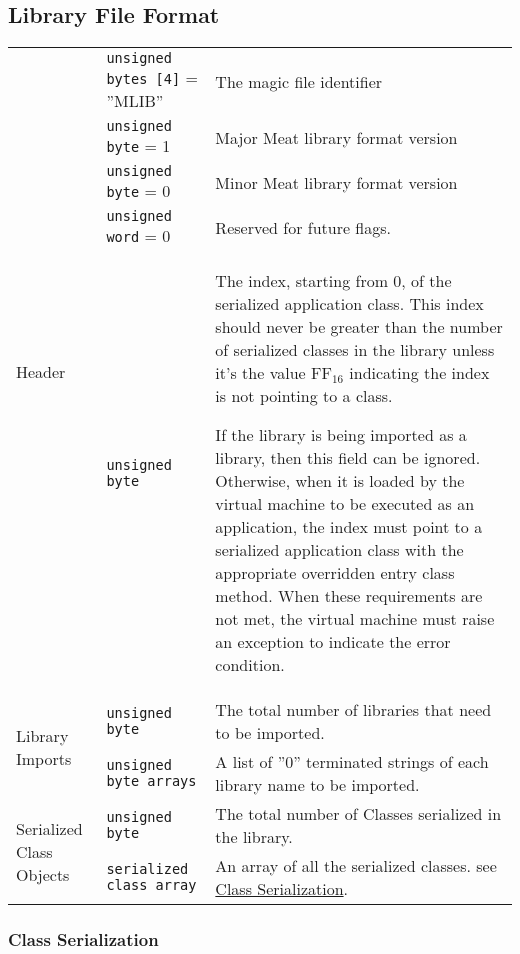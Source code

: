 \subsection{Library File Format}

\begin{center}
  \begin{tabular}{ |l|l|p{8cm}| }
    \hline
    \multirow{5}{*}{Header} & \texttt{unsigned bytes [4]} = ''MLIB'' & The magic file identifier\\ \cline{2-3}
    & \texttt{unsigned byte} = 1 & Major Meat library format version\\ \cline{2-3}
    & \texttt{unsigned byte} = 0 & Minor Meat library format version\\ \cline{2-3}
    & \texttt{unsigned word} = 0 & Reserved for future flags.\\ \cline{2-3}
    & \texttt{unsigned byte} & The index, starting from 0, of the serialized application class. This index should never be greater than the number of serialized classes in the library unless it's the value $\mathrm{FF_{16}}$ indicating the index is not pointing to a class.\par
    If the library is being imported as a library, then this field can be ignored. Otherwise, when it is loaded by the virtual machine to be executed as an application, the index must point to a serialized application class with the appropriate overridden entry class method. When these requirements are not met, the virtual machine must raise an exception to indicate the error condition.\\ \hline

    \multirow{2}{*}{Library Imports} & \texttt{unsigned byte} & The total number of libraries that need to be imported.\\ \cline{2-3}
    & \texttt{unsigned byte arrays} & A list of ''0'' terminated strings of each library name to be imported.\\ \hline

    \multirow{2}{*}{Serialized Class Objects} & \texttt{unsigned byte} & The total number of Classes serialized in the library.\\ \cline{2-3}
    & \texttt{serialized class array} & An array of all the serialized classes. see \hyperref[sec:class_serial]{Class Serialization}.\\ \hline
  \end{tabular}
\end{center}

\subsubsection{Class Serialization}
\label{sec:class_serial}

